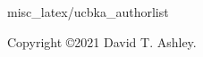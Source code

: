 \thispagestyle{empty}

\vspace*{1cm}
\begin{flushright}
\Huge\bfseries
\ucbkatitle{}
\end{flushright}
\vspace{0.0cm}
\begin{flushright}
\LARGE\bfseries
\ucbkaedition{}
\end{flushright}
\vfill
\begin{flushright}
\begin{normalsize}
 {misc_latex/ucbka_authorlist}
\end{normalsize}
\end{flushright}
\vspace{0.2cm}

\pagebreak
\thispagestyle{empty}
\begin{small}
  \noindent Copyright \copyright 2021 David T. Ashley.
\end{small}

\vfill


